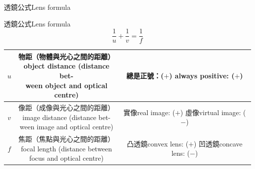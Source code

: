 \documentclass[beamer=true]{standalone}
\begin{document}
\begin{frame}{透鏡公式Lens formula}
    \begin{alertblock}
        {透鏡公式Lens formula}
        \begin{equation}
            \frac{1}{u}+\frac{1}{v}=\frac{1}{f}
        \end{equation}
    \end{alertblock}
    \renewcommand{\arraystretch}{3.2}
    \begin{table}
        \centering
        \begin{tabular}{c||c|c}
            $u$ & \makecell[l]{物距（物體與光心之間的距離） \\object distance (distance bet-\\ween object and optical centre)} & \makecell[l]{總是正號：($+$)\\always positive: ($+$)}\\
            \hline
            $v$ & \makecell[l]{像距（成像與光心之間的距離） \\image distance (distance bet-\\ween image and optical centre)} & \makecell[l]{實像real image: ($+$)\\虛像virtual image: ($-$)}\\
            \hline
            $f$ & \makecell[l]{焦距（焦點與光心之間的距離） \\focal length (distance between\\focus and optical centre)} & \makecell[l]{凸透鏡convex lens: ($+$)\\凹透鏡concave lens: ($-$)}\\
        \end{tabular}
        \label{tab:my_label}
    \end{table}
\end{frame}
\end{document}
